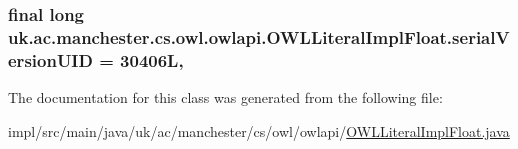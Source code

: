 \hypertarget{classuk_1_1ac_1_1manchester_1_1cs_1_1owl_1_1owlapi_1_1_o_w_l_literal_impl_float_a441fa0fbbd6ba9b3331ce2566f8adc58}{
\subsubsection[{serial\-Version\-U\-I\-D}]{\setlength{\rightskip}{0pt plus 5cm}final long uk.\-ac.\-manchester.\-cs.\-owl.\-owlapi.\-O\-W\-L\-Literal\-Impl\-Float.\-serial\-Version\-U\-I\-D = 30406\-L\hspace{0.3cm}{\ttfamily [static]}, {\ttfamily [private]}}}\label{classuk_1_1ac_1_1manchester_1_1cs_1_1owl_1_1owlapi_1_1_o_w_l_literal_impl_float_a441fa0fbbd6ba9b3331ce2566f8adc58}


The documentation for this class was generated from the following file\-:\begin{DoxyCompactItemize}
\item 
impl/src/main/java/uk/ac/manchester/cs/owl/owlapi/\hyperlink{_o_w_l_literal_impl_float_8java}{O\-W\-L\-Literal\-Impl\-Float.\-java}\end{DoxyCompactItemize}
